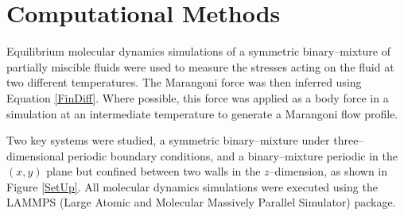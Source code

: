 \section{Computational Methods}

Equilibrium molecular dynamics simulations of a symmetric binary--mixture of partially miscible fluids were used to measure the stresses acting on the fluid at two different temperatures.
The Marangoni force was then inferred using Equation \ref{FinDiff}.
Where possible, this force was applied as a body force in a simulation at an intermediate temperature to generate a Marangoni flow profile.

Two key systems were studied, a symmetric binary–mixture under three--dimensional periodic boundary conditions, and a binary--mixture periodic in the $(x,y)$ plane but confined between two walls in the $z$--dimension, as shown in Figure \ref{SetUp}.
All molecular dynamics simulations were executed using the LAMMPS (Large Atomic and Molecular Massively Parallel Simulator) package.\cite{LAMMPS}  

